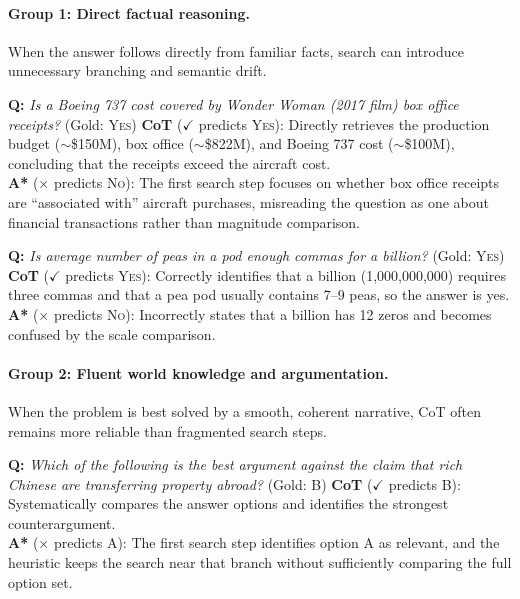 \documentclass{article}
\begin{document}
\paragraph{Group 1: Direct factual reasoning.}
When the answer follows directly from familiar facts, search can introduce unnecessary branching and semantic drift.

\begin{examplebox}[title=StrategyQA --- Direct Factual Reasoning]
\textbf{Q:} \emph{Is a Boeing 737 cost covered by \textit{Wonder Woman} (2017 film) box office receipts?} \quad (Gold: \textsc{Yes})
\tcblower
\textbf{CoT} ($\checkmark$ predicts \textsc{Yes}): Directly retrieves the production budget ($\sim$\$150M), box office ($\sim$\$822M), and Boeing 737 cost ($\sim$\$100M), concluding that the receipts exceed the aircraft cost.\\[4pt]
\textbf{A*} ($\times$ predicts \textsc{No}): The first search step focuses on whether box office receipts are ``associated with'' aircraft purchases, misreading the question as one about financial transactions rather than magnitude comparison.
\end{examplebox}

\begin{examplebox}[title=StrategyQA --- Direct Factual Reasoning]
\textbf{Q:} \emph{Is average number of peas in a pod enough commas for a billion?} \quad (Gold: \textsc{Yes})
\tcblower
\textbf{CoT} ($\checkmark$ predicts \textsc{Yes}): Correctly identifies that a billion (1,000,000,000) requires three commas and that a pea pod usually contains 7--9 peas, so the answer is yes.\\[4pt]
\textbf{A*} ($\times$ predicts \textsc{No}): Incorrectly states that a billion has 12 zeros and becomes confused by the scale comparison.
\end{examplebox}

\paragraph{Group 2: Fluent world knowledge and argumentation.}
When the problem is best solved by a smooth, coherent narrative, CoT often remains more reliable than fragmented search steps.

\begin{examplebox}[title=LogicQA --- Fluent Argumentation]
\textbf{Q:} \emph{Which of the following is the best argument against the claim that rich Chinese are transferring property abroad?} \quad (Gold: B)
\tcblower
\textbf{CoT} ($\checkmark$ predicts B): Systematically compares the answer options and identifies the strongest counterargument.\\[4pt]
\textbf{A*} ($\times$ predicts A): The first search step identifies option A as relevant, and the heuristic keeps the search near that branch without sufficiently comparing the full option set.
\end{examplebox}
\end{document}
